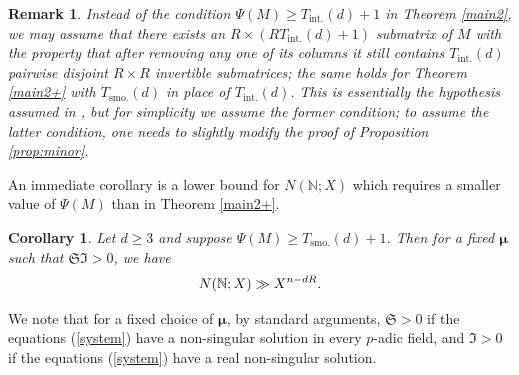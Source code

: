 \documentclass[reqno, 12pt, reqno]{amsart}
\numberwithin{equation}{section}
\newtheorem{corollary}[theorem]{Corollary}
\newtheorem{remark}[theorem]{Remark}
\newcommand{\NN}{\mathbb{N}}
\renewcommand{\geq}{\geqslant}
\renewcommand{\=}{\equiv}
\begin{document}
\begin{remark}
Instead of the condition $\Psi(M) \geq T_{\text{int.}}(d) + 1$ in Theorem \ref{main2},
we may assume that there exists an $R \times  (R T_{\text{int.}}(d) + 1)$ submatrix of $M$ with the property that after removing any one of its columns it still contains
$T_{\text{int.}}(d)$ pairwise disjoint $R \times R$ invertible submatrices; the same holds for  Theorem \ref{main2+} with $T_{\text{smo.}}(d)$ in place of $T_{\text{int.}}(d)$.
This is essentially the hypothesis assumed in \cite{BC}, but for simplicity we assume the former condition; to assume the latter condition, one needs to slightly modify  the proof of
Proposition \ref{prop:minor}.
\end{remark}

An immediate corollary is a lower bound for  $N(\NN; X)$ which requires a smaller value of $\Psi(M)$  than in Theorem \ref{main2+}.
\begin{corollary}\label{cor:lowerbound}
Let $d \geq 3$ and suppose $\Psi(M) \geq T_{\text{smo.}}(d) + 1$.
Then for a fixed $\boldsymbol{\mu}$ such that $\mathfrak{SI} >0$, we have
\begin{eqnarray}
\notag
N(\NN; X) \gg   X^{n - d R}.
\end{eqnarray}
\end{corollary}


We note that for a fixed choice of $\boldsymbol{\mu}$, by standard arguments, $\mathfrak{S} > 0$ if the equations (\ref{system}) have a non-singular solution in every $p$-adic field, and $\mathfrak{I} > 0$ if the equations (\ref{system}) have a real non-singular solution.
\newline
\end{document}
